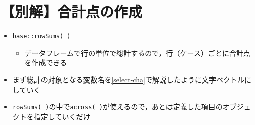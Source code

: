 \documentclass[
  xelatex,ja=standard, b5paper]{bxjsbook}
\providecommand{\tightlist}{%
  \setlength{\itemsep}{0pt}\setlength{\parskip}{0pt}}
\begin{document}
\hypertarget{mu-total-ef}{%
\section{【別解】合計点の作成}\label{mu-total-ef}}

\begin{itemize}
\tightlist
\item
  \texttt{base::rowSums(\ )}

  \begin{itemize}
  \tightlist
  \item
    データフレームで行の単位で総計するので，行（ケース）ごとに合計点を作成できる
  \end{itemize}
\item
  まず総計の対象となる変数名を\ref{select-cha}で解説したように文字ベクトルにしていく
\item
  \texttt{rowSums(\ )}の中で\texttt{across(\ )}が使えるので，あとは定義した項目のオブジェクトを指定していくだけ
\end{itemize}
\end{document}
